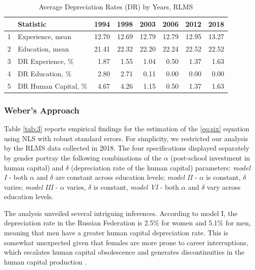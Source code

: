 \documentclass[12pt,a4paper]{article}
\numberwithin{equation}{section}
\begin{document}
\begin{table}[h!]
	\centering
	\caption{Average Depreciation Rates (DR) by Years, RLMS}
	\label{tab:2}
	\begin{tabular}{rlrrrrrr}
		\hline
		& \textbf{Statistic} & \textbf{1994} & \textbf{1998} & \textbf{2003} & \textbf{2006} & \textbf{2012} & \textbf{2018} \\ 
		\hline
		1 & Experience, mean & 12.70 & 12.69 & 12.79 & 12.79 & 12.95 & 13.27 \\ 
		2 & Education, mean & 21.41 & 22.32 & 22.20 & 22.24 & 22.52 & 22.52 \\ 
		\midrule
		3 & DR Experience, \% & 1.87 & 1.55 & 1.04 & 0.50 & 1.37 & 1.63 \\ 
		4 & DR Education, \% & 2.80 & 2.71 & 0.11 & 0.00 & 0.00 & 0.00 \\ 
		5 & DR Human Capital, \% & 4.67 & 4.26 & 1.15 & 0.50 & 1.37 & 1.63 \\ 
		\hline
	\end{tabular}
\end{table}
	
\subsubsection*{Weber's Approach}

Table \ref{tab:3} reports empirical findings for the estimation of the \ref{eq:six} equation using NLS with robust standard errors. For simplicity, we restricted our analysis by the RLMS data collected in 2018. The four specifications displayed separately by gender portray the following combinations of the $\alpha$ (post-school investment in human capital) and $\delta$ (depreciation rate of the human capital) parameters: \textit{model I} - both $\alpha$ and $\delta$ are constant across education levels; \textit{model II} - $\alpha$ is constant, $\delta$ varies; \textit{model III} - $\alpha$ varies, $\delta$ is constant, \textit{model VI} - both $\alpha$ and $\delta$ vary across education levels.

The analysis unveiled several intriguing inferences. According to model I, the depreciation rate in the Russian Federation is 2.5\% for women and 5.1\% for men, meaning that men have a greater human capital depreciation rate. This is somewhat unexpected given that females are more prone to career interruptions, which escalates human capital obsolescence and generates discontinuities in the human capital production \parencite{weber_173._2008}.
\end{document}
